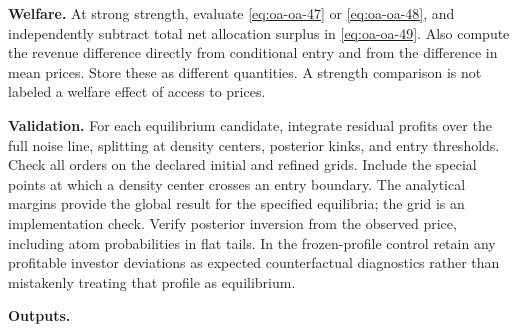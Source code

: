 \documentclass[
  11pt,
]{article}
\begin{document}


\textbf{Welfare.} At strong strength, evaluate \eqref{eq:oa-oa-47} or
\eqref{eq:oa-oa-48}, and independently subtract total net allocation
surplus in \eqref{eq:oa-oa-49}. Also compute the revenue difference
directly from conditional entry and from the difference in mean prices.
Store these as different quantities. A strength comparison is not
labeled a welfare effect of access to prices.

\textbf{Validation.} For each equilibrium candidate, integrate residual
profits over the full noise line, splitting at density centers,
posterior kinks, and entry thresholds. Check all orders on the declared
initial and refined grids. Include the special points at which a density
center crosses an entry boundary. The analytical margins provide the
global result for the specified equilibria; the grid is an
implementation check. Verify posterior inversion from the observed
price, including atom probabilities in flat tails. In the frozen-profile
control retain any profitable investor deviations as expected
counterfactual diagnostics rather than mistakenly treating that profile
as equilibrium.

\textbf{Outputs.}
\end{document}
